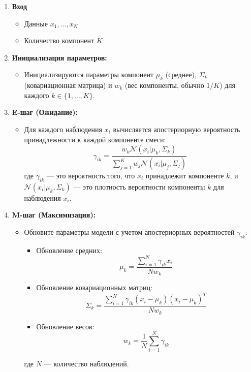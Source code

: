 \begin{enumerate}
    \item \textbf{Вход}
    \begin{itemize}
        \item Данные $x_1, \ldots, x_N$
        \item Количество компонент $K$
    \end{itemize}
    \item \textbf{Инициализация параметров:}
    \begin{itemize}
        \item Инициализируются параметры компонент $\mu_k$ (среднее), $\Sigma_k$ (ковариационная матрица) и $w_k$ (вес компоненты, обычно $1/ K$) для каждого $k \in \{1, \dots, K\}$.
    \end{itemize}

    \item \textbf{E-шаг (Ожидание):}
    \begin{itemize}
        \item Для каждого наблюдения $x_i$ вычисляется апостериорную вероятность принадлежности к каждой компоненте смеси:
        \[
        \gamma_{ik} = \frac{w_k \mathcal{N}(x_i | \mu_k, \Sigma_k)}{\sum_{j=1}^{K} w_j \mathcal{N}(x_i | \mu_j, \Sigma_j)}
        \]
        где $\gamma_{ik}$ — это вероятность того, что $x_i$ принадлежит компоненте $k$, и $\mathcal{N}(x_i | \mu_k, \Sigma_k)$ — это плотность вероятности компоненты $k$ для наблюдения $x_i$.
    \end{itemize}

    \item \textbf{M-шаг (Максимизация):}
    \begin{itemize}
        \item Обновите параметры модели с учетом апостериорных вероятностей $\gamma_{ik}$:
        \begin{itemize}
            \item Обновление средних:
            \[
            \mu_k = \frac{\sum_{i=1}^{N} \gamma_{ik} x_i}{Nw_k}
            \]
            \item Обновление ковариационных матриц:
            \[
            \Sigma_k = \frac{\sum_{i=1}^{N} \gamma_{ik} (x_i - \mu_k)(x_i - \mu_k)^T}{Nw_k}
            \]
            \item Обновление весов:
            \[
            w_k = \frac{1}{N} \sum_{i=1}^{N} \gamma_{ik}
            \]
        \end{itemize}
        где $N$ — количество наблюдений.
    \end{itemize}


\end{enumerate}
